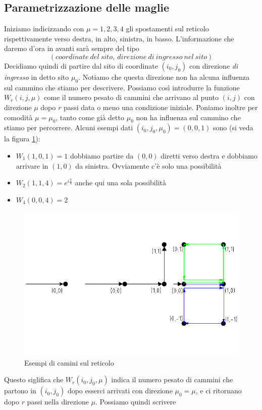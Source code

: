 \documentclass[11pt]{article}
\begin{document}
\subsection{Parametrizzazione delle maglie}
Iniziamo indicizzando con $\mu=1,2,3,4$ gli spostamenti sul reticolo rispettivamente verso destra, in alto, sinistra, in basso.
L'informazione che daremo d'ora in avanti sarà sempre del tipo
$$ (coordinate \ del \ sito, \ direzione \ di \ ingresso \ nel \ sito)
$$
Decidiamo quindi di partire dal sito di coordinate $(i_0,j_0)$ con direzione \emph{di ingresso} in detto sito $\mu_0$. Notiamo che questa direzione non ha alcuna influenza sul cammino che stiamo per descrivere. Possiamo così introdurre la funzione $W_r(i,j,\mu)$ come il numero pesato di cammini che arrivano al punto $(i,j)$ con direzione $\mu$ dopo $r$ passi data o meno una condizione iniziale. Poniamo inoltre per comodità $\mu=\mu_0$, tanto come già detto $\mu_0$ non ha influenza sul cammino che stiamo per percorrere. Alcuni esempi dati $(i_0,j_0,\mu_0)=(0,0,1)$ sono (si veda la figura \ref{v6}):
\begin{itemize}
\item{$W_1(1,0,1)=1$ dobbiamo partire da $(0,0)$ diretti verso destra e dobbiamo arrivare in $(1,0)$ da sinistra. Ovviamente c'è solo una possibilità}
\item{$W_2(1,1,4)=e^{i\frac{\pi}{4}}$ anche qui una sola possibilità}
\item{$W_4(0,0,4)=2$}
\end{itemize}
\begin{figure}[h]
\centering
\includegraphics[width=0.8\columnwidth]{v6}
\caption{Esempi di camini sul reticolo}
\label{v6}
\end{figure}
 Questo siglifica che $W_r(i_0,j_0,\mu)$ indica il numero pesato di cammini che partono in $(i_0,j_0)$ dopo esserci arrivati con direzione $\mu_0=\mu$, e ci ritornano dopo $r$ passi nella direzione $\mu$. Possiamo quindi scrivere
\end{document}
